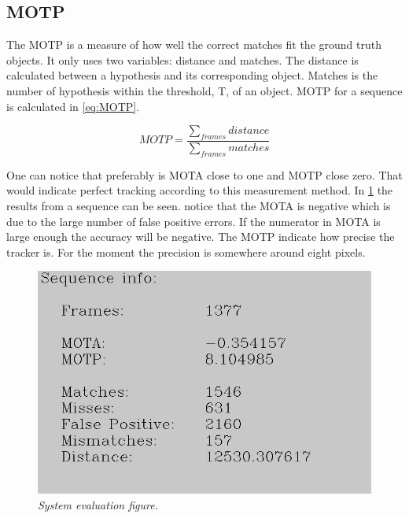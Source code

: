 \subsection{MOTP}
The MOTP is a measure of how well the correct matches fit the ground truth objects. It only uses two variables: distance and matches. The distance is calculated between a hypothesis and its corresponding object. Matches is the number of hypothesis within the 
threshold, T, of an object. MOTP for a sequence is calculated in \eqref{eq:MOTP}.

\begin{equation}
\label{eq:MOTP}
MOTP = \frac{\sum_{frames}{distance}}{\sum_{frames}{matches}}
\end{equation}

One can notice that preferably is MOTA close to one and MOTP close zero. That would indicate perfect tracking according to this measurement method. In \ref{fig:system_evaluation_fig} the results from a sequence can be seen. notice that the MOTA is negative which is due to the large number of false positive errors. If the numerator in MOTA is large enough the accuracy will be negative. The MOTP indicate how precise the tracker is. For the moment the precision is somewhere around eight pixels.


\begin{figure}[htb]
	\centering
	\includegraphics[width=\linewidth]{images/sequenceEvaluation}
	\caption{\textit{System evaluation figure.}}
	\label{fig:system_evaluation_fig} %
\end{figure}




